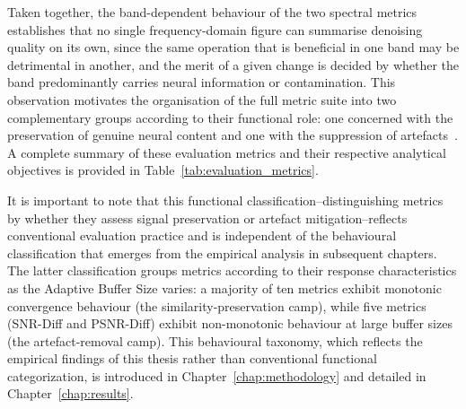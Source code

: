\documentclass[MScCS,12pt,oneside,final]{uccthesis}
\begin{document}
        Taken together, the band-dependent behaviour of the two spectral metrics establishes that no single frequency-domain figure can summarise denoising quality on its own, since the same operation that is beneficial in one band may be detrimental in another, and the merit of a given change is decided by whether the band predominantly carries neural information or contamination. This observation motivates the organisation of the full metric suite into two complementary groups according to their functional role: one concerned with the preservation of genuine neural content and one with the suppression of artefacts~\parencite{sweeney2012artifact, longo2026framework}. A complete summary of these evaluation metrics and their respective analytical objectives is provided in Table~\ref{tab:evaluation_metrics}.

It is important to note that this functional classification--distinguishing metrics by whether they assess signal preservation or artefact mitigation--reflects conventional evaluation practice and is independent of the behavioural classification that emerges from the empirical analysis in subsequent chapters. The latter classification groups metrics according to their response characteristics as the Adaptive Buffer Size varies: a majority of ten metrics exhibit monotonic convergence behaviour (the similarity-preservation camp), while five metrics (SNR-Diff and PSNR-Diff) exhibit non-monotonic behaviour at large buffer sizes (the artefact-removal camp). This behavioural taxonomy, which reflects the empirical findings of this thesis rather than conventional functional categorization, is introduced in Chapter~\ref{chap:methodology} and detailed in Chapter~\ref{chap:results}.
        
\end{document}
